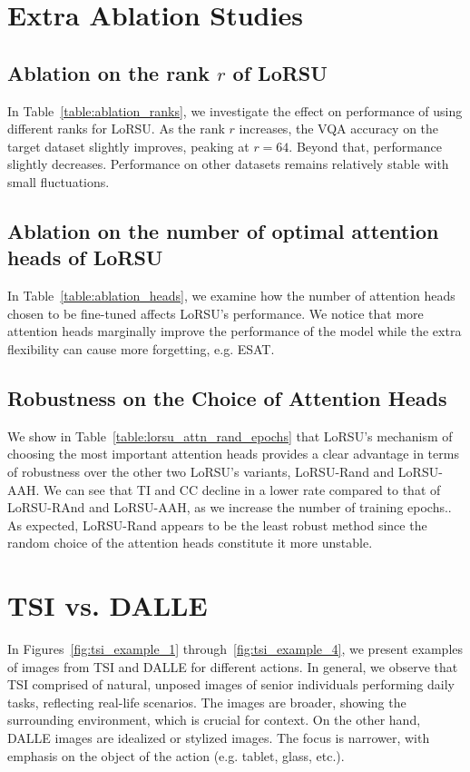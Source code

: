 \section{Extra Ablation Studies}\label{sec_appx:extra_ablations}

\subsection{Ablation on the rank $r$ of LoRSU}
In Table~\ref{table:ablation_ranks}, we investigate the effect on performance of using different ranks for LoRSU. As the rank $r$ increases, the VQA accuracy on the target dataset slightly improves, peaking at $r=64$. Beyond 
that, performance slightly decreases. Performance on other datasets remains relatively stable with small fluctuations.


\subsection{Ablation on the number of optimal attention heads of LoRSU}\label{sec_appx:ablation_heads_general}

In Table~\ref{table:ablation_heads}, we examine how the number of attention heads chosen to be fine-tuned affects LoRSU's performance. We notice that more attention heads marginally improve the performance of the model while the extra flexibility can cause more forgetting, e.g. ESAT.

\subsection{Robustness on the Choice of Attention Heads}\label{sec_appx:robustness}

We show in Table~\ref{table:lorsu_attn_rand_epochs} that LoRSU's mechanism of choosing the most important attention heads provides a clear advantage in terms of robustness over the other two LoRSU's variants, LoRSU-Rand and LoRSU-AAH. We can see that TI and CC decline in a lower rate compared to that of LoRSU-RAnd and LoRSU-AAH, as we increase the number of training epochs.. As expected, LoRSU-Rand appears to be the least robust method since the random choice of the attention heads constitute it more unstable.

\section{TSI vs. DALLE}\label{sec_appx:tsi_vs_dalle}
In Figures~\ref{fig:tsi_example_1} through~\ref{fig:tsi_example_4}, we present examples of images from TSI and DALLE for different actions. In general, we observe that TSI comprised of   natural, unposed images of senior individuals performing daily tasks, reflecting real-life scenarios. The images are broader, showing the surrounding environment, which is crucial for context. On the other hand, DALLE images are idealized or stylized images. The focus is narrower, with emphasis on the object of the action (e.g. tablet, glass, etc.).


